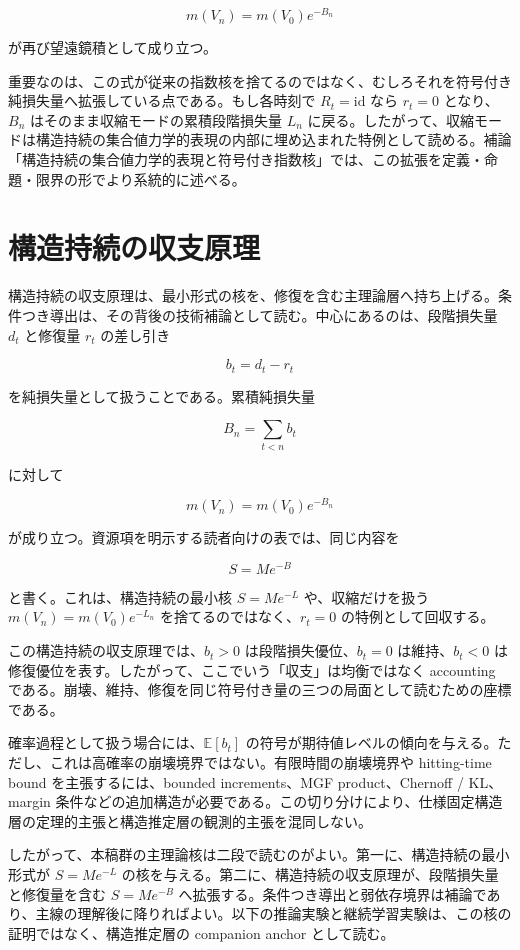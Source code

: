 \documentclass[12pt,a4paper]{article}
\begin{document}
\[
m(V_{n}) = m(V_0) e^{-B_{n}}
\]

が再び望遠鏡積として成り立つ。

重要なのは、この式が従来の指数核を捨てるのではなく、むしろそれを符号付き純損失量へ拡張している点である。もし各時刻で \(R_{t} = \mathrm{id}\) なら \(r_{t} = 0\) となり、\(B_{n}\) はそのまま収縮モードの累積段階損失量 \(L_{n}\) に戻る。したがって、収縮モードは構造持続の集合値力学的表現の内部に埋め込まれた特例として読める。補論「構造持続の集合値力学的表現と符号付き指数核」では、この拡張を定義・命題・限界の形でより系統的に述べる。

\section{構造持続の収支原理}\label{ux69cbux9020ux6301ux7d9aux306eux53ceux652fux539fux7406}

構造持続の収支原理は、最小形式の核を、修復を含む主理論層へ持ち上げる。条件つき導出は、その背後の技術補論として読む。中心にあるのは、段階損失量 \(d_{t}\) と修復量 \(r_{t}\) の差し引き

\[
b_{t} = d_{t} - r_{t}
\]

を純損失量として扱うことである。累積純損失量

\[
B_{n} = \sum_{t<n} b_{t}
\]

に対して

\[
m(V_{n}) = m(V_0) e^{-B_{n}}
\]

が成り立つ。資源項を明示する読者向けの表では、同じ内容を

\[
S = M e^{-B}
\]

と書く。これは、構造持続の最小核 \(S=Me^{-L}\) や、収縮だけを扱う \(m(V_{n})=m(V_0)e^{-L_{n}}\) を捨てるのではなく、\(r_{t}=0\) の特例として回収する。

この構造持続の収支原理では、\(b_{t}>0\) は段階損失優位、\(b_{t}=0\) は維持、\(b_{t}<0\) は修復優位を表す。したがって、ここでいう「収支」は均衡ではなく accounting である。崩壊、維持、修復を同じ符号付き量の三つの局面として読むための座標である。

確率過程として扱う場合には、\(\mathbb E[b_{t}]\) の符号が期待値レベルの傾向を与える。ただし、これは高確率の崩壊境界ではない。有限時間の崩壊境界や hitting-time bound を主張するには、bounded increments、MGF product、Chernoff / KL、margin 条件などの追加構造が必要である。この切り分けにより、仕様固定構造層の定理的主張と構造推定層の観測的主張を混同しない。

したがって、本稿群の主理論核は二段で読むのがよい。第一に、構造持続の最小形式が \(S=Me^{-L}\) の核を与える。第二に、構造持続の収支原理が、段階損失量と修復量を含む \(S=Me^{-B}\) へ拡張する。条件つき導出と弱依存境界は補論であり、主線の理解後に降りればよい。以下の推論実験と継続学習実験は、この核の証明ではなく、構造推定層の companion anchor として読む。
\end{document}
